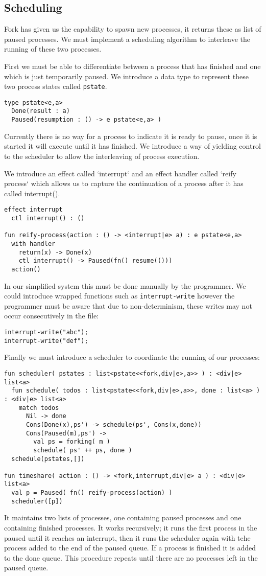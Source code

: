\documentclass[logo,bsc,singlespacing,parskip]{infthesis}
\begin{document}
\subsection*{Scheduling}
Fork has given us the capability to spawn new processes, it returns these as list of paused processes. We must implement a scheduling algorithm to interleave the running of these two processes.

First we must be able to differentiate between a process that has finished and one which is just temporarily paused. We introduce a data type to represent these two process states called \texttt{pstate}. 
\begin{lstlisting}
type pstate<e,a>
  Done(result : a)
  Paused(resumption : () -> e pstate<e,a> )
\end{lstlisting}

Currently there is no way for a process to indicate it is ready to pause, once it is started it will execute until it has finished. We introduce a way of yielding control to the scheduler to allow the interleaving of process execution.

We introduce an effect called `interrupt` and an effect handler called `reify process` which allows us to capture the continuation of a process after it has called interrupt().
\begin{lstlisting}
effect interrupt
  ctl interrupt() : ()

fun reify-process(action : () -> <interrupt|e> a) : e pstate<e,a> 
  with handler  
    return(x) -> Done(x)
    ctl interrupt() -> Paused(fn() resume(()))
  action()
\end{lstlisting}
In our simplified system this must be done manually by the programmer. We could introduce wrapped functions such as \texttt{interrupt-write} however the programmer must be aware that due to non-determinism, these writes may not occur consecutively in the file:
\begin{lstlisting}
interrupt-write("abc");
interrupt-write("def");
\end{lstlisting}


Finally we must introduce a scheduler to coordinate the running of our processes: 
\begin{lstlisting}
fun scheduler( pstates : list<pstate<<fork,div|e>,a>> ) : <div|e> list<a>
  fun schedule( todos : list<pstate<<fork,div|e>,a>>, done : list<a> ) : <div|e> list<a>
    match todos
      Nil -> done
      Cons(Done(x),ps') -> schedule(ps', Cons(x,done))
      Cons(Paused(m),ps') ->
        val ps = forking( m )
        schedule( ps' ++ ps, done )
  schedule(pstates,[])

fun timeshare( action : () -> <fork,interrupt,div|e> a ) : <div|e> list<a>
  val p = Paused( fn() reify-process(action) )
  scheduler([p])
\end{lstlisting}
It maintains two lists of processes, one containing paused processes and one containing finished processes. It works recursively; it runs the first process in the paused until it reaches an interrupt, then it runs the scheduler again with tehe process added to the end of the paused queue. If a process is finished it is added to the done queue. This procedure repeats until there are no processes left in the paused queue.
\end{document}
